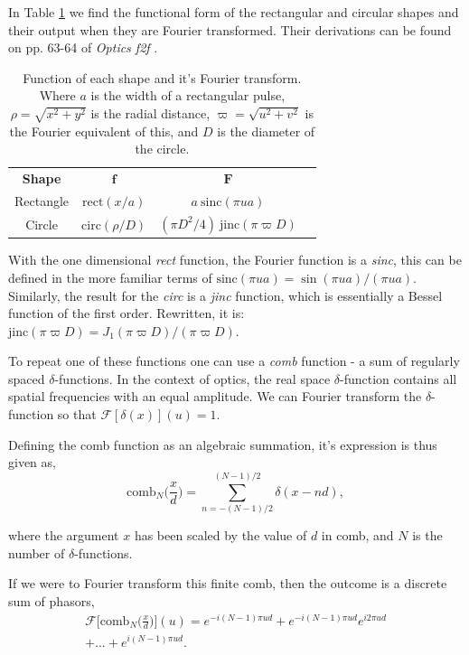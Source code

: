 \documentclass[twocolumn]{revtex4}
\begin{document}
In Table \ref{fshapes} we find the functional form of the rectangular and circular shapes and their output when they are Fourier transformed. Their derivations can be found on pp. 63-64 of \textit{Optics f2f} \cite{of2f}. 
\begin{table}[h!]
\centering
\begin{tabular}{c@{\hskip 20pt}c@{\hskip 20pt}c@{\hskip 10pt}c} 
 \hline
 \textbf{Shape} 	& \textbf{$\boldsymbol{f}$} 		& \textbf{$\boldsymbol{F}$} \\ [1ex] 
 Rectangle 	& $\text{rect}(x/a)$ 				& $a\: \text{sinc}(\pi ua)$ \\ 
 Circle 		& $\text{circ}(\rho/D)$ 			& $(\pi D^2/4)\: \text{jinc}(\pi \varpi D)$ \\
 \hline
\end{tabular}
\caption{Function of each shape and it's Fourier transform. Where $a$ is the width of a rectangular pulse, $\rho=\sqrt{x^2+y^2}$ is the radial distance, $\varpi=\sqrt{u^2+v^2}$ is the Fourier equivalent of this, and $D$ is the diameter of the circle.}
\label{fshapes}
\end{table}
\setlength{\belowcaptionskip}{-10pt}

With the one dimensional \textit{rect} function, the Fourier function is a \textit{sinc}, this can be defined in the more familiar terms of $\text{sinc}(\pi ua)=\sin (\pi ua)/(\pi ua)$. Similarly, the result for the \textit{circ} is a \textit{jinc} function, which is essentially a Bessel function of the first order. Rewritten, it is: $\text{jinc}(\pi \varpi D)=J_1 (\pi \varpi D)/(\pi \varpi D)$.

To repeat one of these functions one can use a \textit{comb} function - a sum of regularly spaced $\delta$-functions. In the context of optics, the real space $\delta$-function contains all spatial frequencies with an equal amplitude. We can Fourier transform the $\delta$-function so that $\mathcal{F}[\delta(x)](u)=1$.

Defining the comb function as an algebraic summation, it's expression is thus given as,
\begin{equation}
\text{comb}_N \Big(\frac{x}{d}\Big) = \sum_{n=-(N-1)/2}^{(N-1)/2} \delta(x-nd),
\end{equation}

where the argument $x$ has been scaled by the value of $d$ in comb, and $N$ is the number of $\delta$-functions.

If we were to Fourier transform this finite comb, then the outcome is a discrete sum of phasors, 
\begin{multline}
\mathcal{F}\Big[\text{comb}_N\Big(\frac{x}{d}\Big)\Big](u)=e^{-i(N-1)\pi ud} + e^{-i(N-1)\pi ud}e^{i2\pi ud}\\+...+e^{i(N-1)\pi ud}.
\end{multline}
\end{document}
